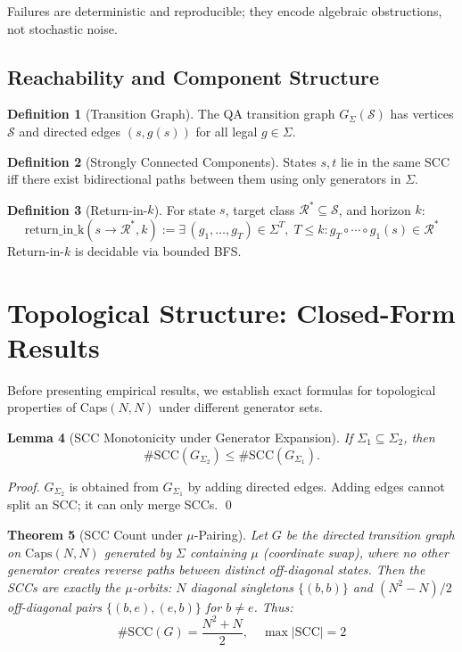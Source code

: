 \documentclass[11pt]{article}
\newtheorem{theorem}{Theorem}[section]
\newtheorem{lemma}[theorem]{Lemma}
\theoremstyle{definition}
\newtheorem{definition}[theorem]{Definition}
\begin{document}
Failures are deterministic and reproducible; they encode algebraic obstructions, not stochastic noise.

\subsection{Reachability and Component Structure}

\begin{definition}[Transition Graph]
The QA transition graph $G_\Sigma(\mathcal{S})$ has vertices $\mathcal{S}$ and directed edges $(s, g(s))$ for all legal $g \in \Sigma$.
\end{definition}

\begin{definition}[Strongly Connected Components]
States $s,t$ lie in the same SCC iff there exist bidirectional paths between them using only generators in $\Sigma$.
\end{definition}

\begin{definition}[Return-in-$k$]
For state $s$, target class $\mathcal{R}^* \subseteq \mathcal{S}$, and horizon $k$:
\[
\mathrm{return\_in\_k}(s \to \mathcal{R}^*, k) := \exists \, (g_1, \dots, g_T) \in \Sigma^T, \; T \le k : g_T \circ \cdots \circ g_1(s) \in \mathcal{R}^*
\]
Return-in-$k$ is decidable via bounded BFS.
\end{definition}

\section{Topological Structure: Closed-Form Results}
\label{sec:theorems}

Before presenting empirical results, we establish exact formulas for topological properties of Caps$(N,N)$ under different generator sets.

\begin{lemma}[SCC Monotonicity under Generator Expansion]
\label{lem:scc_mono}
If $\Sigma_1 \subseteq \Sigma_2$, then
\[
\#\mathrm{SCC}(G_{\Sigma_2}) \le \#\mathrm{SCC}(G_{\Sigma_1}).
\]
\end{lemma}
\begin{proof}
$G_{\Sigma_2}$ is obtained from $G_{\Sigma_1}$ by adding directed edges. Adding edges cannot split an SCC; it can only merge SCCs. \qed
\end{proof}

\begin{theorem}[SCC Count under $\mu$-Pairing]
\label{thm:mu_pairing}
Let $G$ be the directed transition graph on $\mathrm{Caps}(N,N)$ generated by $\Sigma$ containing $\mu$ (coordinate swap), where no other generator creates reverse paths between distinct off-diagonal states. Then the SCCs are exactly the $\mu$-orbits: $N$ diagonal singletons $\{(b,b)\}$ and $(N^2-N)/2$ off-diagonal pairs $\{(b,e), (e,b)\}$ for $b \neq e$. Thus:
\[
\#\mathrm{SCC}(G) = \frac{N^2 + N}{2}, \quad \max|\mathrm{SCC}| = 2
\]
\end{theorem}
\end{document}
